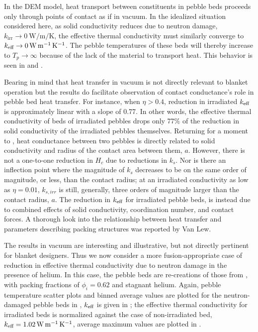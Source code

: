 In the DEM model, heat transport between constituents in pebble beds proceeds only through points of contact as if in vacuum. In the idealized situation considered here, as solid conductivity reduces due to neutron damage, $k_\text{irr} \rightarrow \SI{0}{\watt\per\meter\per\kelvin}$, the effective thermal conductivity must similarly converge to $k_\text{eff} \rightarrow \SI{0}{\watt\per\meter\per\kelvin}$. The pebble temperatures of these beds will thereby increase to $T_p \rightarrow \infty$ because of the lack of the material to transport heat. This behavior is seen in  and .

Bearing in mind that heat transfer in vacuum is not directly relevant to blanket operation but the results do facilitate observation of contact conductance's role in pebble bed heat transfer. For instance, when $\eta > 0.4$, reduction in irradiated $k_\text{eff}$ is approximately linear with a slope of \num{0.77}. In other words, the effective thermal conductivity of beds of irradiated pebbles drops only 77\% of the reduction in solid conductivity of the irradiated pebbles themselves. Returning for a moment to , heat conductance between two pebbles is directly related to solid conductivity and radius of the contact area between them, $a$. However, there is not a one-to-one reduction in $H_c$ due to reductions in $k_s$. Nor is there an inflection point where the magnitude of $k_s$ decreases to be on the same order of magnitude, or less, than the contact radius; at an irradiated conductivity as low as $\eta = 0.01$, $k_{s,irr}$ is still, generally, three orders of magnitude larger than the contact radius, $a$. The reduction in $k_\text{eff}$ for irradiated pebble beds, is instead due to combined effects of solid conductivity, coordination number, and contact forces. A thorough look into the relationship between heat transfer and parameters describing packing structures was reported by Van Lew\etal.\cite{VanLew2014}

The results in vacuum are interesting and illustrative, but not directly pertinent for blanket designers. Thus we now consider a more fusion-appropriate case of reduction in effective thermal conductivity due to neutron damage in the presence of helium. In this case, the pebble beds are re-creations of those from , with packing fractions of $\phi_i = 0.62$ and stagnant helium. Again, pebble temperature scatter plots and binned average values are plotted for the neutron-damaged pebble beds in , $k_\text{eff}$ is given in ; the effective thermal conductivity for irradiated beds is normalized against the case of non-irradiated bed, $k_\text{eff} = \SI{1.02}{\watt\per\meter\per\kelvin}$, average maximum values are plotted in .

